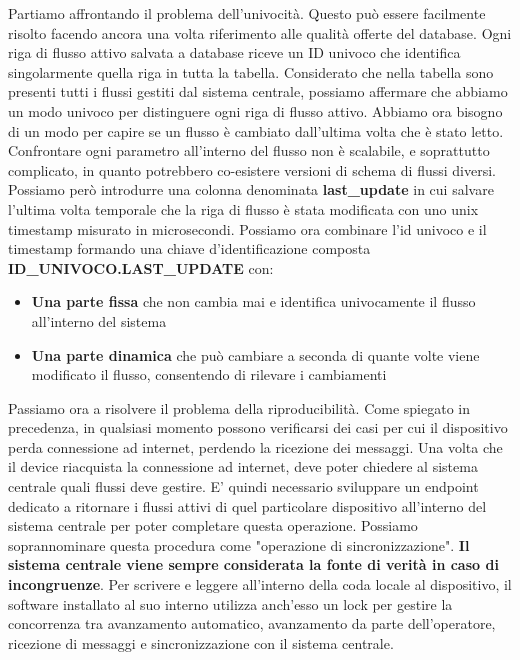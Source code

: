 \documentclass[a4paper, titlepage, 12pt, openright, twoside]{book}
\begin{document}
Partiamo affrontando il problema dell'univocità. Questo può essere facilmente risolto facendo ancora una volta riferimento alle qualità offerte del database. Ogni riga di flusso attivo salvata a database riceve un ID univoco che identifica singolarmente quella riga in tutta la tabella. Considerato che nella tabella sono presenti tutti i flussi gestiti dal sistema centrale, possiamo affermare che abbiamo un modo univoco per distinguere ogni riga di flusso attivo.
\newline
Abbiamo ora bisogno di un modo per capire se un flusso è cambiato dall'ultima volta che è stato letto. Confrontare ogni parametro all'interno del flusso non è scalabile, e soprattutto complicato, in quanto potrebbero co-esistere versioni di schema di flussi diversi. Possiamo però introdurre una colonna denominata \textbf{last\_update} in cui salvare l'ultima volta temporale che la riga di flusso è stata modificata con uno unix timestamp misurato in microsecondi.
\newline
Possiamo ora combinare l'id univoco e il timestamp formando una chiave d'identificazione composta \textbf{ID\_UNIVOCO.LAST\_UPDATE} con:
\begin{itemize}
	\item \textbf{Una parte fissa} che non cambia mai e identifica univocamente il flusso all'interno del sistema
	\item \textbf{Una parte dinamica} che può cambiare a seconda di quante volte viene modificato il flusso, consentendo di rilevare i cambiamenti
\end{itemize}
Passiamo ora a risolvere il problema della riproducibilità. Come spiegato in precedenza, in qualsiasi momento possono verificarsi dei casi per cui il dispositivo perda connessione ad internet, perdendo la ricezione dei messaggi. Una volta che il device riacquista la connessione ad internet, deve poter chiedere al sistema centrale quali flussi deve gestire. E' quindi necessario sviluppare un endpoint dedicato a ritornare i flussi attivi di quel particolare dispositivo all'interno del sistema centrale per poter completare questa operazione. Possiamo soprannominare questa procedura come "operazione di sincronizzazione". \textbf{Il sistema centrale viene sempre considerata la fonte di verità in caso di incongruenze}. Per scrivere e leggere all'interno della coda locale al dispositivo, il software installato al suo interno utilizza anch'esso un lock per gestire la concorrenza tra avanzamento automatico, avanzamento da parte dell'operatore, ricezione di messaggi e sincronizzazione con il sistema centrale.
\end{document}
